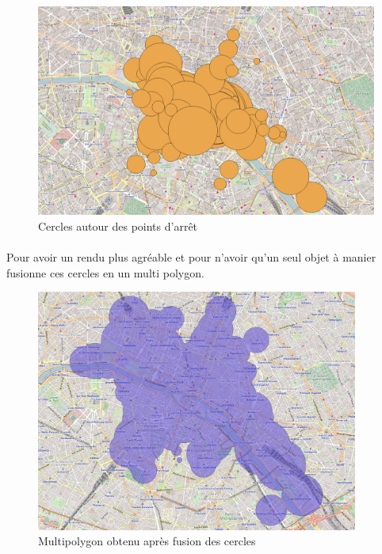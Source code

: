 \documentclass[a4paper]{report}
\begin{document}
\begin{figure}[H]
	\begin{center}
		\includegraphics[width=400pt]{image/premiers_isochrones}
		\caption{Cercles autour des points d'arrêt}
		\label{Cercles autour des points d'arrêt}
	\end{center}
\end{figure}

\paragraph{} Pour avoir un rendu plus agréable et pour n'avoir qu'un seul objet à manier fusionne ces cercles en un multi polygon.

\begin{figure}[H]
	\begin{center}
		\includegraphics[width=300pt]{image/iso_merged}
		\caption{Multipolygon obtenu après fusion des cercles}
		\label{Multipolygon obtenu après fusion des cercles}
	\end{center}
\end{figure}
\end{document}
